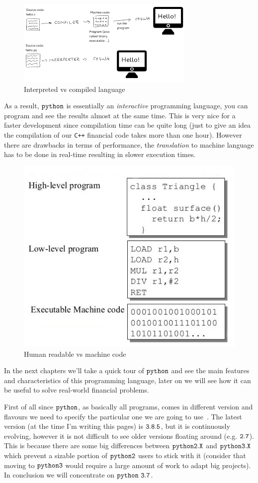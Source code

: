 \begin{figure}[h]
\centering
\includegraphics[width=0.7\linewidth]{figures/index.png}
\caption{Interpreted vs compiled language}
\end{figure}

As a result, \(\tt{python}\) is essentially an \emph{interactive} programming language, you can program and see the results almost at the same time. This is very nice for a faster development since compilation time can be quite long (just to give an idea the compilation of our \texttt{C++} financial code takes more than one hour).
However there are drawbacks in terms of performance, the \emph{translation} to machine language has to be done in real-time resulting in slower execution times.

\begin{figure}[h]
\centering
\includegraphics[width=0.5\linewidth]{figures/machine_language.jpeg}
\caption{Human readable vs machine code}
\end{figure}

In the next chapters we'll take a quick tour of $\tt{python}$ and see the main features and characteristics of this programming language, later on we will see how it can be useful to solve real-world financial problems.

First of all since $\tt{python}$, as basically all programs, comes in different version and flavours we need to specify the particular one we are going to use~\cite{python_versions}.
The latest version (at the time I'm writing this pages) is \(\tt{3.8.5}\), but it is continuously evolving, however it is not difficult to see older versions floating around (e.g. \(\tt{2.7}\)).
This is because there are some big differences between \(\tt{python 2.X}\) and \(\tt{python 3.X}\) which prevent a sizable portion of \(\tt{python 2}\) users to stick with it (consider that moving to \(\tt{python 3}\) would require a large amount of work to adapt big projects).
In conclusion we will concentrate on \textbf{\(\tt{python~3.7}\)}.

